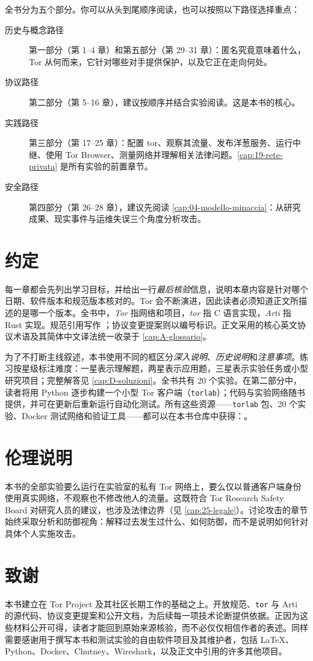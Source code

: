 全书分为五个部分。你可以从头到尾顺序阅读，也可以按照以下路径选择重点：
\begin{description}
  \item[历史与概念路径] 第一部分（第 1--4 章）和第五部分（第 29--31 章）：匿名究竟意味着什么，Tor 从何而来，它针对哪些对手提供保护，以及它正在走向何处。
  \item[协议路径] 第二部分（第 5--16 章），建议按顺序并结合实验阅读。这是本书的核心。
  \item[实践路径] 第三部分（第 17--25 章）：配置 tor、观察其流量、发布洋葱服务、运行中继、使用 Tor Browser、测量网络并理解相关法律问题。\cref{cap:19-rete-privata} 是所有实验的前置章节。
  \item[安全路径] 第四部分（第 26--28 章），建议先阅读 \cref{cap:04-modello-minaccia}：从研究成果、现实事件与运维失误三个角度分析攻击。
\end{description}

\section*{约定}

每一章都会先列出学习目标，并给出一行\emph{最后核验}信息，说明本章内容是针对哪个日期、软件版本和规范版本核对的。Tor 会不断演进，因此读者必须知道正文所描述的是哪一个版本。全书中，\emph{Tor} 指网络和项目，\emph{tor} 指 C 语言实现，\emph{Arti} 指 Rust 实现。规范引用写作 ；协议变更提案则以编号标识。正文采用的核心英文协议术语及其简体中文译法统一收录于 \cref{cap:A-glossario}。

为了不打断主线叙述，本书使用不同的框区分\emph{深入说明}、\emph{历史说明}和\emph{注意事项}。练习按星级标注难度：一星表示理解题，两星表示应用题，三星表示实验任务或小型研究项目；完整解答见 \cref{cap:D-soluzioni}。全书共有 20 个实验。在第二部分中，读者将用 Python 逐步构建一个小型 Tor 客户端（\texttt{torlab}）；代码与实验网络随书提供，并可在更新后重新运行自动化测试。所有这些资源——\texttt{torlab} 包、20 个实验、Docker 测试网络和验证工具——都可以在本书仓库中获得：\repolibro。

\section*{伦理说明}

本书的全部实验要么运行在实验室的私有 Tor 网络上，要么仅以普通客户端身份使用真实网络，不观察也不修改他人的流量。这既符合 Tor Research Safety Board 对研究人员的建议，也涉及法律边界（见 \cref{cap:25-legale}）。讨论攻击的章节始终采取分析和防御视角：解释过去发生过什么、如何防御，而不是说明如何针对具体个人实施攻击。

\section*{致谢}

本书建立在 Tor Project 及其社区长期工作的基础之上。开放规范、\texttt{tor} 与 Arti 的源代码、协议变更提案和公开文档，为后续每一项技术论断提供依据。正因为这些材料公开可得，读者才能回到原始来源核验，而不必仅仅相信作者的表述。同样需要感谢用于撰写本书和测试实验的自由软件项目及其维护者，包括 \LaTeX{}、Python、Docker、Chutney、Wireshark，以及正文中引用的许多其他项目。
